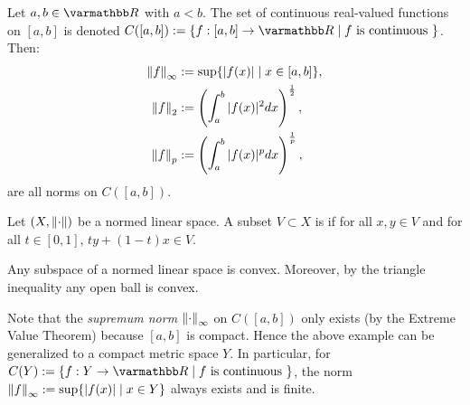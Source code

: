 \begin{example}\label{example:function-space-norms}
    Let $a,b \in \bfR$ with $a < b$. The set of continuous real-valued functions on $[a,b]$ is denoted $C([a,b]) := \{f:[a,b] \rightarrow \bfR \mid f \text{ is continuous }\}$. Then:
        \begin{equation*}
        \begin{split}
            \left\lVert f \right\rVert_\infty &:= \sup\{ |f(x)| \mid x \in [a,b]\}, \\
            \left\lVert f \right\rVert_2 &:= \left( \int_a^b |f(x)|^2 dx \right)^\frac{1}{2}, \\
            \left\lVert f \right\rVert_p &:= \left( \int_a^b |f(x)|^p dx \right)^\frac{1}{p}, \\
        \end{split}
        \end{equation*}
    are all norms on $C([a,b])$.
\end{example}

\begin{definition}
    Let $(X,\left\lVert \cdot \right\rVert)$ be a normed linear space. A subset $V \subset X$ is  if for all $x,y \in V$ and for all $t \in [0,1]$, $ty + (1-t)x \in V$.
\end{definition}

\begin{example}
    Any subspace of a normed linear space is convex. Moreover, by the triangle inequality any open ball is convex.
\end{example}

\begin{remark}
    Note that the \textit{supremum norm} $\left\lVert \cdot \right\rVert_\infty$ on $C([a,b])$ only exists (by the Extreme Value Theorem) because $[a,b]$ is compact. Hence the above example can be generalized to a compact metric space $Y$. In particular, for $C(Y) := \{f:Y \rightarrow \bfR \mid f \text{ is continuous }\}$, the norm $\left\lVert f \right\rVert_\infty := \sup\{|f(x)| \mid x \in Y\}$ always exists and is finite.
\end{remark}

